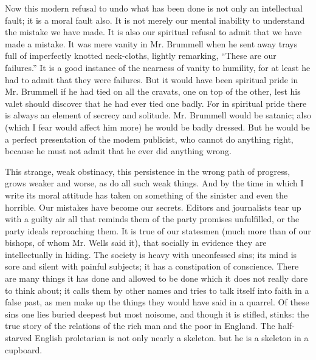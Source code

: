 \documentclass{book}
\begin{document}
Now this modern refusal to undo what has been done is not only an intellectual fault; it is a moral fault also. It is not merely our mental inability to understand the mistake we have made. It is also our spiritual refusal to admit that we have made a mistake. It was mere vanity in Mr. Brummell when he sent away trays full of imperfectly knotted neck-cloths, lightly remarking, “These are our failures.” It is a good instance of the nearness of vanity to humility, for at least he had to admit that they were failures. But it would have been spiritual pride in Mr. Brummell if he had tied on all the cravats, one on top of the other, lest his valet should discover that he had ever tied one badly. For in spiritual pride there is always an element of secrecy and solitude. Mr. Brummell would be satanic; also (which I fear would affect him more) he would be badly dressed. But he would be a perfect presentation of the modem publicist, who cannot do anything right, because he must not admit that he ever did anything wrong.

This strange, weak obstinacy, this persistence in the wrong path of progress, grows weaker and worse, as do all such weak things. And by the time in which I write its moral attitude has taken on something of the sinister and even the horrible. Our mistakes have become our secrets. Editors and journalists tear up with a guilty air all that reminds them of the party promises unfulfilled, or the party ideals reproaching them. It is true of our statesmen (much more than of our bishops, of whom Mr. Wells said it), that socially in evidence they are intellectually in hiding. The society is heavy with unconfessed sins; its mind is sore and silent with painful subjects; it has a constipation of conscience. There are many things it has done and allowed to be done which it does not really dare to think about; it calls them by other names and tries to talk itself into faith in a false past, as men make up the things they would have said in a quarrel. Of these sins one lies buried deepest but most noisome, and though it is stifled, stinks: the true story of the relations of the rich man and the poor in England. The half-starved English proletarian is not only nearly a skeleton. but he is a skeleton in a cupboard.
\end{document}
